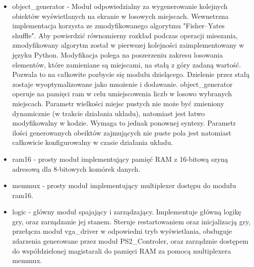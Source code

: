 \documentclass[polish,polish,a4paper]{article}
\begin{document}
\begin{itemize}
 \item
  object\_generator - Moduł odpowiedzialny za wygenerowanie kolejnych obiektów wyświetlanych na ekranie w losowych miejscach.
  Wewnetrzna implementacja korzysta ze zmodyfikowanego algorytmu "Fisher–Yates shuffle".
  Aby powierdzić równomierny rozkład podczas operacji mieszania, zmodyfikowany algorytm został w pierwszej kolejności zaimplementowany w języku Python.
  Modyfikacja polega na poszerzeniu zakresu losowania elementów, które zamieniane są miejscami, na stałą z góry zadaną wartość.
  Pozwala to na całkowite pozbycie się modułu dzielącego.
  Dzielenie przez stałą zostaje wyoptymalizowane jako mnożenie i dodawanie.
  object\_generator operuje na pamięci ram w celu umiejscowenia liczb w losowo wybranych miejscach.
  Parametr wielkości miejsc pustych nie może być zmieniony dynamicznie (w trakcie działania układu), natomiast jest łatwo modyfikowalny w kodzie.
  Wymaga to jednak ponownej syntezy.
  Parametr ilości generowanych obeiktów zajmujących nie puste pola jest natomiast całkowicie konfigurowalny w czasie działania układu.

 \item
   ram16 - prosty moduł implementujący pamięć RAM z 16-bitową szyną adresową dla 8-bitowych komórek danych.

 \item
   memmux - prosty moduł implementujący multiplexer dostępu do modułu ram16.

 \item
  logic - główny moduł spajający i zarządzający.
  Implementuje główną logikę gry, oraz zarządzanie jej stanem.
  Steruje restartowaniem oraz inicjalizacją gry, przełącza moduł vga\_driver w odpowiedni tryb wyświetlania, obsługuje zdarzenia generowane przez moduł 
  PS2\_Controler, oraz zarządznie dostępem do współdzielonej magistarali do pamięci RAM za pomocą multiplexera memmux.


\end{itemize}
\end{document}
